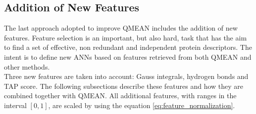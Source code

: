 \subsection{Addition of New Features}
\label{subsec:addition_of_new_features}
The last approach adopted to improve QMEAN includes the addition of new features. Feature selection is an important, but also hard, task that has the aim to find a set of effective, non redundant and independent protein descriptors. The intent is to define new ANNs based on features retrieved from both QMEAN and other methods.\\
Three new features are taken into account: Gauss integrals, hydrogen bonds and TAP score. The following subsections describe these features and how they are combined together with QMEAN. All additional features, with ranges in the interval $[0, 1]$, are scaled by using the equation \ref{eq:feature_normalization}.

